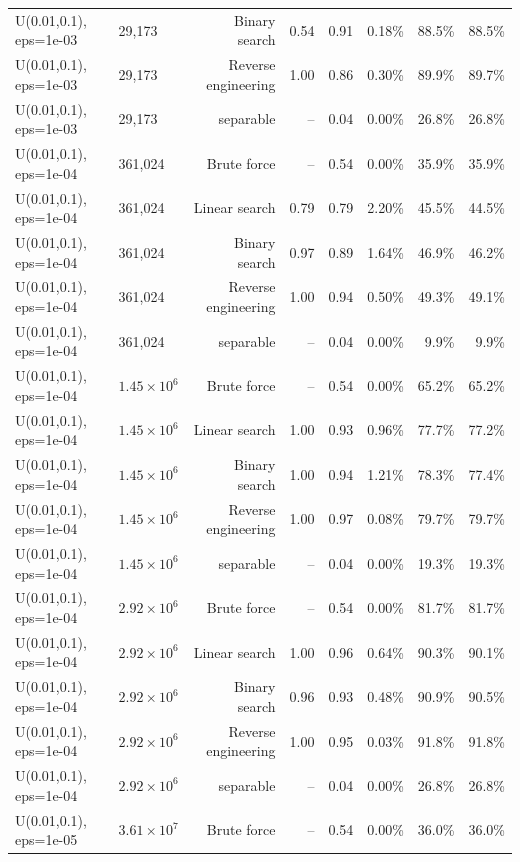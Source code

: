 \begin{tabular}{llrrrrrr}
U(0.01,0.1), eps=1e-03 & 29,173 & Binary search & 0.54 & 0.91 & 0.18\% & 88.5\% & 88.5\% \\
U(0.01,0.1), eps=1e-03 & 29,173 & Reverse engineering & 1.00 & 0.86 & 0.30\% & 89.9\% & 89.7\% \\
U(0.01,0.1), eps=1e-03 & 29,173 & separable & -- & 0.04 & 0.00\% & 26.8\% & 26.8\% \\
U(0.01,0.1), eps=1e-04 & 361,024 & Brute force & -- & 0.54 & 0.00\% & 35.9\% & 35.9\% \\
U(0.01,0.1), eps=1e-04 & 361,024 & Linear search & 0.79 & 0.79 & 2.20\% & 45.5\% & 44.5\% \\
U(0.01,0.1), eps=1e-04 & 361,024 & Binary search & 0.97 & 0.89 & 1.64\% & 46.9\% & 46.2\% \\
U(0.01,0.1), eps=1e-04 & 361,024 & Reverse engineering & 1.00 & 0.94 & 0.50\% & 49.3\% & 49.1\% \\
U(0.01,0.1), eps=1e-04 & 361,024 & separable & -- & 0.04 & 0.00\% & 9.9\% & 9.9\% \\
U(0.01,0.1), eps=1e-04 & $1.45\times 10^{6}$ & Brute force & -- & 0.54 & 0.00\% & 65.2\% & 65.2\% \\
U(0.01,0.1), eps=1e-04 & $1.45\times 10^{6}$ & Linear search & 1.00 & 0.93 & 0.96\% & 77.7\% & 77.2\% \\
U(0.01,0.1), eps=1e-04 & $1.45\times 10^{6}$ & Binary search & 1.00 & 0.94 & 1.21\% & 78.3\% & 77.4\% \\
U(0.01,0.1), eps=1e-04 & $1.45\times 10^{6}$ & Reverse engineering & 1.00 & 0.97 & 0.08\% & 79.7\% & 79.7\% \\
U(0.01,0.1), eps=1e-04 & $1.45\times 10^{6}$ & separable & -- & 0.04 & 0.00\% & 19.3\% & 19.3\% \\
U(0.01,0.1), eps=1e-04 & $2.92\times 10^{6}$ & Brute force & -- & 0.54 & 0.00\% & 81.7\% & 81.7\% \\
U(0.01,0.1), eps=1e-04 & $2.92\times 10^{6}$ & Linear search & 1.00 & 0.96 & 0.64\% & 90.3\% & 90.1\% \\
U(0.01,0.1), eps=1e-04 & $2.92\times 10^{6}$ & Binary search & 0.96 & 0.93 & 0.48\% & 90.9\% & 90.5\% \\
U(0.01,0.1), eps=1e-04 & $2.92\times 10^{6}$ & Reverse engineering & 1.00 & 0.95 & 0.03\% & 91.8\% & 91.8\% \\
U(0.01,0.1), eps=1e-04 & $2.92\times 10^{6}$ & separable & -- & 0.04 & 0.00\% & 26.8\% & 26.8\% \\
U(0.01,0.1), eps=1e-05 & $3.61\times 10^{7}$ & Brute force & -- & 0.54 & 0.00\% & 36.0\% & 36.0\% \\

\end{tabular}
